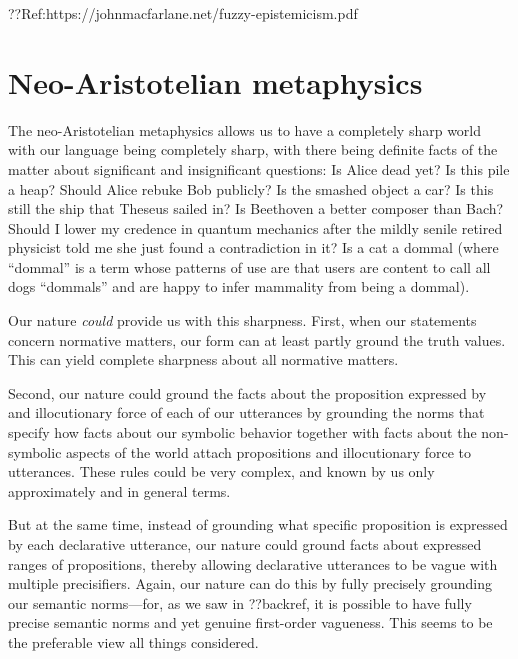 ??Ref:https://johnmacfarlane.net/fuzzy-epistemicism.pdf

\section{Neo-Aristotelian metaphysics}
The neo-Aristotelian metaphysics allows us to have a completely sharp world with our language being completely sharp, with there being
definite facts of the matter about significant and insignificant
questions: Is Alice dead yet? Is this pile a heap? Should Alice rebuke Bob publicly? Is the smashed object a car?
Is this still the ship that Theseus sailed in? Is Beethoven a better composer than Bach? Should I lower my credence in quantum
mechanics after the mildly senile retired physicist told me she just found a contradiction in it? Is a cat a dommal (where ``dommal''
is a term whose patterns of use are that users are content to call all dogs ``dommals'' and are happy to infer mammality from being
a dommal). 

Our nature \textit{could} provide us with this sharpness. First, when our statements concern normative matters, our 
form can at least partly ground the truth values. This can yield complete sharpness about all normative matters.

Second, our nature could ground the facts about the proposition expressed by and illocutionary force of each of our utterances 
by grounding the norms that specify how facts about our symbolic behavior together with facts about the non-symbolic aspects of the world attach 
propositions and illocutionary force to utterances. These rules could be very complex, and known by us only approximately and in general
terms. 

But at the same time, instead of grounding what specific proposition is expressed by each declarative utterance, our nature could 
ground facts about expressed ranges of propositions, thereby allowing declarative utterances to be vague with multiple precisifiers. Again, our nature 
can do this by fully precisely grounding our semantic norms---for, as we saw in ??backref, it is possible to have fully precise
semantic norms and yet genuine first-order vagueness. This seems to be the preferable view all things considered.

